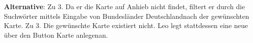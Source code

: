 \textbf{Alternative}:
\newline Zu 3. Da er die Karte auf Anhieb nicht findet, filtert er durch die Suchwörter mittels Eingabe von \dq Bundesländer Deutschland\dq nach der gewünschten Karte.
\newline Zu 3. Die gewünschte Karte existiert nicht. Leo legt stattdessen eine neue über den Button \dq Karte anlegen\dq an.
